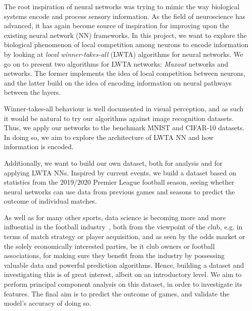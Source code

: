 The root inspiration of neural networks was trying to mimic the way biological systems encode and process sensory information. As the field of neuroscience has advanced, it has again become source of inspiration for improving upon the existing neural network (NN) frameworks. In this project, we want to explore the biological phenomenon of local competition among neurons to encode information by looking at \textit{local winner-takes-all} (LWTA) algorithms for neural networks. We go on to present two algorithms for LWTA networks: \textit{Maxout} networks and  networks. The former implements the idea of local competition between neurons, and the latter build on the idea of encoding information on neural pathways between the layers.

Winner-takes-all behaviour is well documented in visual perception, and as such it would be natural to try our algorithms against image recognition datasets. Thus, we apply our networks to the benchmark MNIST and CIFAR-10 datasets. In doing so, we aim to explore the architecture of LWTA NN and how information is encoded.

Additionally, we want to build our own dataset, both for analysis and for applying LWTA NNs. Inspired by current events, we build a dataset based on statistics from the 2019/2020 Premier League football season, seeing whether neural networks can use data from previous games and seasons to predict the outcome of individual matches.

As well as for many other sports, data science is becoming more and more influential in the football industry~\citep{Herbinet2018}, both from the viewpoint of the club, e.g. in terms of match strategy or player acquisition, and as seen by the odds market or the solely economically interested parties, be it club owners or football associations, for making sure they benefit from the industry by possessing valuable data and powerful prediction algorithms. Hence, building a dataset and investigating this is of great interest, albeit on an introductory level. We aim to perform principal component analysis on this dataset, in order to investigate its features. The final aim is to predict the outcome of games, and validate the model's accuracy of doing so. 

